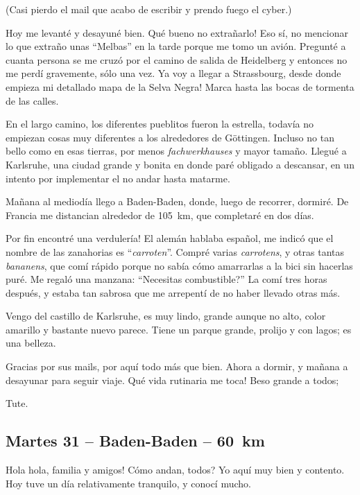 (Casi pierdo el mail que acabo de escribir y prendo fuego el cyber.)

Hoy me levant\'e y desayun\'e bien. \textexclamdown Qu\'e bueno no
extra\~narlo! Eso s\'i, no mencionar lo que extra\~no unas ``Melbas'' en la
tarde porque me tomo un avi\'on. Pregunt\'e a cuanta persona se me cruz\'o por
el camino de salida de Heidelberg y entonces no me perd\'i gravemente, s\'olo
una vez. \textexclamdown Ya voy a llegar a Strassbourg, desde donde empieza mi
detallado mapa de la Selva Negra! Marca hasta las bocas de tormenta de las
calles.

En el largo camino, los diferentes pueblitos fueron la estrella, todav\'ia no
empiezan cosas muy diferentes a los alrededores de G\"ottingen. Incluso no tan
bello como en esas tierras, por menos \emph{fachwerkhauses} y mayor tama\~no.
Llegu\'e a Karlsruhe, una ciudad grande y bonita en donde par\'e obligado a
descansar, en un intento por implementar el no andar hasta matarme.

Ma\~nana al mediod\'ia llego a Baden-Baden, donde, luego de recorrer, dormir\'e.
De Francia me distancian alrededor de 105~km, que completar\'e en dos d\'ias.

\textexclamdown Por fin encontr\'e una verduler\'ia! El alem\'an hablaba
espa\~nol, me indic\'o que el nombre de las zanahorias es ``\emph{carroten}''.
Compr\'e varias \emph{carrotens}, y otras tantas \emph{bananens}, que com\'i
r\'apido porque no sab\'ia c\'omo amarrarlas a la bici sin hacerlas pur\'e. Me
regal\'o una manzana: ``\textquestiondown Necesitas combustible?'' La com\'i
tres horas despu\'es, y estaba tan sabrosa que me arrepent\'i de no haber
llevado otras m\'as.

Vengo del castillo de Karlsruhe, es muy lindo, grande aunque no alto, color
amarillo y bastante nuevo parece. Tiene un parque grande, prolijo y con lagos;
es una belleza.

Gracias por sus mails, por aqu\'i todo m\'as que bien. Ahora a dormir, y
ma\~nana a desayunar para seguir viaje. \textexclamdown Qu\'e vida rutinaria
me toca! Beso grande a todos;

Tute.

\subsection*{Martes 31 -- Baden-Baden -- 60~km}

\textexclamdown Hola hola, familia y amigos! \textquestiondown C\'omo andan,
todos? Yo aqu\'i muy bien y contento. Hoy tuve un d\'ia relativamente
tranquilo, y conoc\'i mucho.

